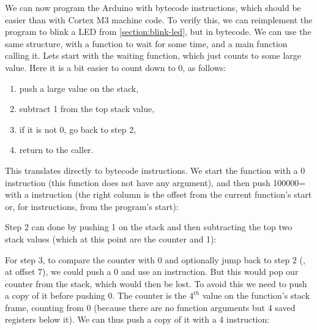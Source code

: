 We can now program the Arduino with bytecode instructions, which should be
easier than with Cortex M3 machine code. To verify this, we can reimplement the
program to blink a LED from \cref{section:blink-led}, but in bytecode. We can
use the same structure, with a function to wait for some time, and a main
function calling it. Lets start with the waiting function, which just counts to
some large value. Here it is a bit easier to count down to 0, as follows:
\begin{enumerate}
  \item push a large value on the stack,
  \item subtract 1 from the top stack value,
  \item if it is not 0, go back to step 2,
  \item return to the caller.
\end{enumerate}

This translates directly to bytecode instructions. We start the function with a
 0 instruction (this function does not have any argument), and then
push 100000= with a  instruction (the right column
is the offset from the current function's start or, for  instructions,
from the program's start):



Step 2 can done by pushing 1 on the stack and then subtracting the top two
stack values (which at this point are the counter and 1):


For step 3, to compare the counter with 0 and optionally jump back to step 2
(\ie, at offset 7), we could push a 0 and use an  instruction. But
this would pop our counter from the stack, which would then be lost. To avoid
this we need to push a copy of it before pushing 0. The counter is the $4^{th}$
value on the function's stack frame, counting from 0 (because there are no
function arguments but 4 saved registers below it). We can thus push a copy of
it with a  4 instruction:


